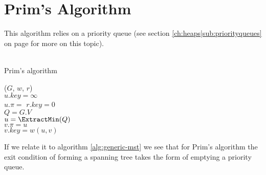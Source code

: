 \section{Prim's Algorithm}
This algorithm relies on a priority queue (see section
\ref{ch:heaps|sub:priorityqueues} on page \pageref{ch:heaps|sub:priorityqueues}
for more on this topic).
\\\\
\begin{algorithm}[H]
	\caption{Prim's algorithm}
	\label{alg:prim-mst}
	
	
	
	
	
	\BlankLine
	\PrimMST($G$, $w$, $r$) \\
	\Begin
	{
		{
			$u.key = \infty$ \\
			$u.\pi = $ \Nil
		}
		$r.key = 0$ \\
		$Q = G.V$ \\
		
		{
			$u = \ExtractMin(Q)$ \\
			{
				{
					$v.\pi = u$ \\
					$v.key = w(u, v)$
				}
			}
		}
	}
\end{algorithm}
If we relate it to algorithm \ref{alg:generic-mst} we see that for Prim's
algorithm the exit condition of forming a spanning tree takes the form of
emptying a priority queue.

